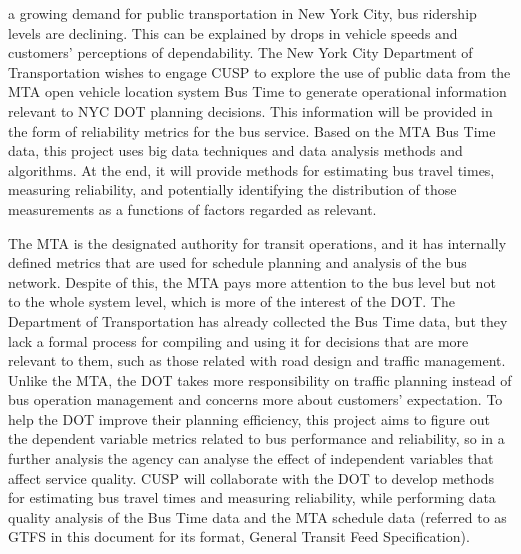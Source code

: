 \documentclass[12pt,journal,compsoc]{IEEEtran}
\begin{document}
% 
% 
% 
% 
 a growing demand for public transportation in New York City, bus ridership levels are declining. This can be explained by drops in vehicle speeds and customers’ perceptions of dependability. The New York City Department of Transportation wishes to engage CUSP to explore the use of public data from the MTA open vehicle location system Bus Time to generate operational information relevant to NYC DOT planning decisions. This information will be provided in the form of reliability metrics for the bus service.
Based on the MTA Bus Time data, this project uses big data techniques and data analysis methods and algorithms. At the end, it will provide methods for estimating bus travel times, measuring reliability, and potentially identifying the distribution of those measurements as a functions of factors regarded as relevant.

The MTA is the designated authority for transit operations, and it has internally defined metrics that are used for schedule planning and analysis of the bus network. Despite of this, the MTA pays more attention to the bus level but not to the whole system level, which is more of the interest of the DOT. The Department of Transportation has already collected the Bus Time data, but they lack a formal process for compiling and using it for decisions that are more relevant to them, such as those related with road design and traffic management. 
Unlike the MTA, the DOT takes more responsibility on traffic planning instead of bus operation management and concerns more about customers’ expectation. To help the DOT improve their planning efficiency, this project aims to figure out the dependent variable metrics related to bus performance and reliability, so in a further analysis the agency can analyse the effect of independent variables that affect service quality. CUSP will collaborate with the DOT to develop methods for estimating bus travel times and measuring reliability, while performing data quality analysis of the Bus Time data and the MTA schedule data (referred to as GTFS in this document for its format, General Transit Feed Specification).
\end{document}
